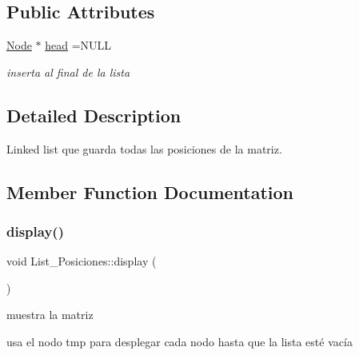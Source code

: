 \subsection*{Public Attributes}
\begin{DoxyCompactItemize}
\item 
\mbox{\label{classList__Posiciones_a553a00aec72532e6283344f515da588b}} 
\hyperlink{classNode}{Node} $\ast$ \hyperlink{classList__Posiciones_a553a00aec72532e6283344f515da588b}{head} =N\+U\+LL
\begin{DoxyCompactList}\small\item\em inserta al final de la lista \end{DoxyCompactList}\end{DoxyCompactItemize}


\subsection{Detailed Description}
Linked list que guarda todas las posiciones de la matriz. 

\subsection{Member Function Documentation}
\mbox{\label{classList__Posiciones_a910b5a43c3e371a026dc182617a6a20c}} 
\subsubsection{\texorpdfstring{display()}{display()}}
{\footnotesize\ttfamily void List\+\_\+\+Posiciones\+::display (\begin{DoxyParamCaption}{ }\end{DoxyParamCaption})\hspace{0.3cm}{\ttfamily [inline]}}



muestra la matriz 

usa el nodo tmp para desplegar cada nodo hasta que la lista esté vacía \mbox{\label{classList__Posiciones_adc4bc1ffeea86fde520563bc165f4e4b}} 

